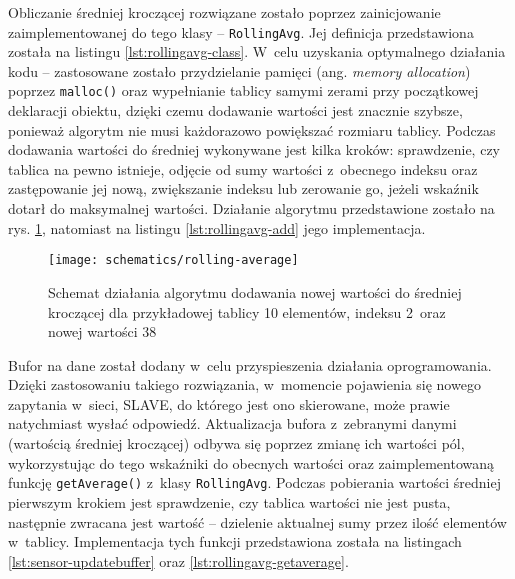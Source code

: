 

Obliczanie średniej kroczącej rozwiązane zostało poprzez zainicjowanie zaimplementowanej do tego klasy --
\texttt{RollingAvg}. Jej definicja przedstawiona została na listingu \ref{lst:rollingavg-class}. W~celu uzyskania
optymalnego działania kodu -- zastosowane zostało przydzielanie pamięci (ang. \textsl{memory allocation}) poprzez
\texttt{malloc()} oraz wypełnianie tablicy samymi zerami przy początkowej deklaracji obiektu, dzięki czemu dodawanie
wartości jest znacznie szybsze, ponieważ algorytm nie musi każdorazowo powiększać rozmiaru tablicy. Podczas dodawania
wartości do średniej wykonywane jest kilka kroków: sprawdzenie, czy tablica na pewno istnieje, odjęcie od sumy wartości
z~obecnego indeksu oraz zastępowanie jej nową, zwiększanie indeksu lub zerowanie go, jeżeli wskaźnik dotarł do
maksymalnej wartości. Działanie algorytmu przedstawione zostało na rys. \ref{img:rolling-average}, natomiast na listingu
\ref{lst:rollingavg-add} jego implementacja.



\begin{figure}[!htbp]
    \centering
    \texttt{[image: schematics/rolling-average]}
    \caption{\label{img:rolling-average}Schemat działania algorytmu dodawania nowej wartości do średniej kroczącej dla
        przykładowej tablicy 10 elementów, indeksu 2~oraz nowej wartości 38}
\end{figure}



Bufor na dane został dodany w~celu przyspieszenia działania oprogramowania. Dzięki zastosowaniu takiego rozwiązania,
w~momencie pojawienia się nowego zapytania w~sieci, SLAVE, do którego jest ono skierowane, może prawie natychmiast
wysłać odpowiedź. Aktualizacja bufora z~zebranymi danymi (wartością średniej kroczącej) odbywa się poprzez zmianę ich
wartości pól, wykorzystując do tego wskaźniki do obecnych wartości oraz zaimplementowaną funkcję \texttt{getAverage()}
z~klasy \texttt{RollingAvg}. Podczas pobierania wartości średniej pierwszym krokiem jest sprawdzenie, czy tablica
wartości nie jest pusta, następnie zwracana jest wartość -- dzielenie aktualnej sumy przez ilość elementów w~tablicy.
Implementacja tych funkcji przedstawiona została na listingach \ref{lst:sensor-updatebuffer} oraz
\ref{lst:rollingavg-getaverage}.

